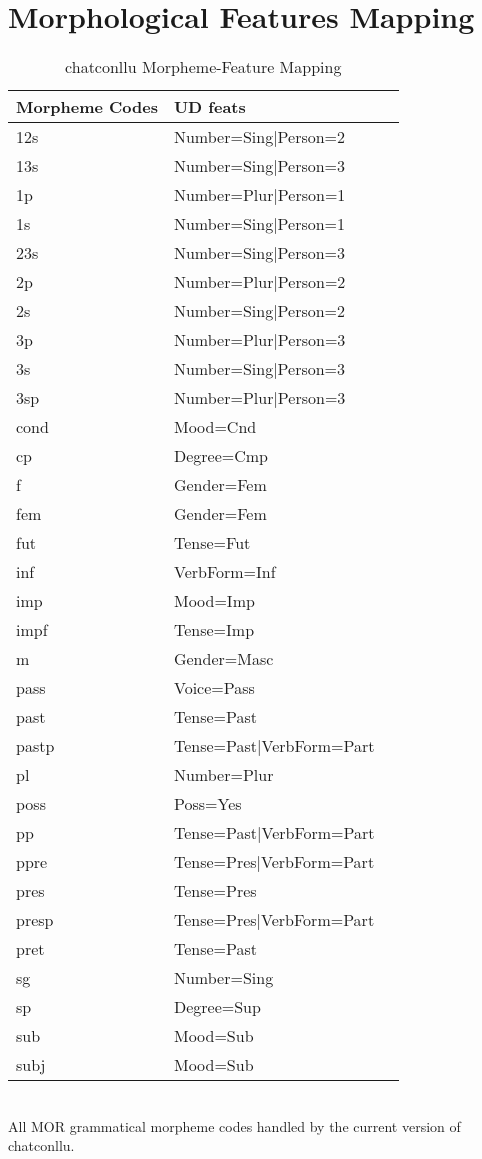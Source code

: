 \newpage
\section{Morphological Features Mapping}
\begin{table}[h!]
\caption {chatconllu Morpheme-Feature Mapping} \label{tab:featsmap}
\centering
\begin{tabularx}{\linewidth}{@{}lXl@{}}
\toprule
\textbf{Morpheme Codes} & \textbf{UD feats}\\ \midrule
    12s & Number=Sing|Person=2\\
    13s & Number=Sing|Person=3\\
    1p & Number=Plur|Person=1\\
    1s & Number=Sing|Person=1\\
    23s & Number=Sing|Person=3\\
    2p & Number=Plur|Person=2\\
    2s & Number=Sing|Person=2\\
    3p & Number=Plur|Person=3\\
    3s & Number=Sing|Person=3\\
    3sp & Number=Plur|Person=3\\
    cond & Mood=Cnd\\
    cp & Degree=Cmp\\
    f & Gender=Fem\\
    fem & Gender=Fem\\
    fut & Tense=Fut\\
    inf & VerbForm=Inf\\
    imp & Mood=Imp\\
    impf & Tense=Imp\\
    m & Gender=Masc\\
    pass & Voice=Pass\\
    past & Tense=Past\\
    pastp & Tense=Past|VerbForm=Part\\
    pl & Number=Plur\\
    poss & Poss=Yes\\
    pp & Tense=Past|VerbForm=Part\\
    ppre & Tense=Pres|VerbForm=Part\\
    pres & Tense=Pres\\
    presp & Tense=Pres|VerbForm=Part\\
    pret & Tense=Past\\
    sg & Number=Sing\\
    sp & Degree=Sup\\
    sub & Mood=Sub\\
    subj & Mood=Sub\\\bottomrule
\end{tabularx}\\
\vspace{0.5cm}
All MOR grammatical morpheme codes handled by the current version of chatconllu.\\
\end{table}


